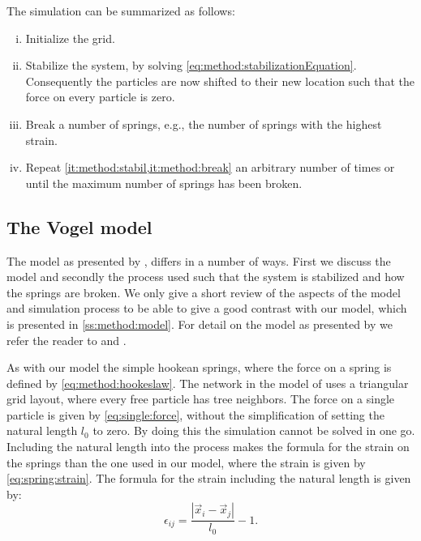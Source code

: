 The simulation can be summarized as follows:
\begin{enumerate}[(i)]
	\item \label{it:method:init} Initialize the grid.
	\item \label{it:method:stabil} Stabilize the system, by solving \cref{eq:method:stabilizationEquation}. Consequently the particles are now shifted to their new location such that the force on every particle is zero.
	\item \label{it:method:break} Break a number of springs, e.g., the number of springs with the highest strain.
	\item \label{it:method:repeat} Repeat \cref{it:method:stabil,it:method:break} an arbitrary number of times or until the maximum number of springs has been broken.
\end{enumerate}

\subsection{The Vogel model}\label{ss:method:vogel}

The model as presented by \citeauthor{vogel2005studies2} \cite{vogel2005studies2}, differs in a number of ways. First we discuss the model and secondly the process used such that the system is stabilized and how the springs are broken. We only give a short review of the aspects of the model and simulation process to be able to give a good contrast with our model, which is presented in \cref{ss:method:model}. For detail on the model as presented by \citeauthor{vogel2005studies2} we refer the reader to \cite{vogel2005studies1} and \cite{vogel2005studies2}. 

As with our model the simple hookean springs, where the force on a spring is defined by \cref{eq:method:hookeslaw}. The network in the model of \citeauthor{vogel2005studies2} uses a triangular grid layout, where every free particle has tree neighbors. The force on a single particle is given by \cref{eq:single:force}, without the simplification of setting the natural length $l_0$ to zero. By doing this the simulation cannot be solved in one go. Including the natural length into the process makes the formula for the strain on the springs than the one used in our model, where the strain is given by \cref{eq:spring:strain}. The formula for the strain including the natural length is given by:
%
\begin{equation}\label{eq:method:strain_vogel}
	\epsilon_{ij} = \frac{|\vec{x}_i - \vec{x}_j|}{l_0} - 1.
\end{equation}

